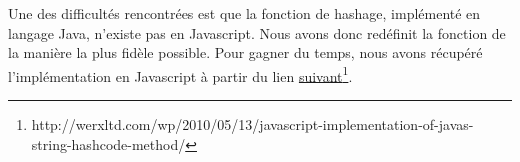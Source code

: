 Une des difficultés rencontrées est que la fonction de hashage, implémenté en langage Java, n'existe pas en Javascript. Nous avons donc redéfinit la fonction de la manière la plus fidèle possible. Pour gagner du temps, nous avons récupéré l'implémentation en Javascript à partir du lien \href{werxltd.com/wp/2010/05/13/javascript-implementation-of-javas-string-hashcode-method/}{suivant\footnote{\url{http://werxltd.com/wp/2010/05/13/javascript-implementation-of-javas-string-hashcode-method/}}}.
